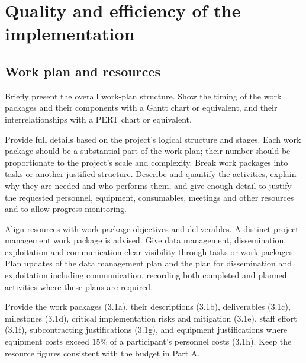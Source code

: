 \section{Quality and efficiency of the implementation}
\label{sec:implementation}


\subsection{Work plan and resources}
\label{sec:work-plan}
\begin{heguidance}
Briefly present the overall work-plan structure. Show the timing of the work
packages and their components with a Gantt chart or equivalent, and their
interrelationships with a PERT chart or equivalent.

Provide full details based on the project's logical structure and stages.
Each work package should be a substantial part of the work plan; their number
should be proportionate to the project's scale and complexity. Break work
packages into tasks or another justified structure. Describe and quantify the
activities, explain why they are needed and who performs them, and give enough
detail to justify the requested personnel, equipment, consumables, meetings and
other resources and to allow progress monitoring.

Align resources with work-package objectives and deliverables. A distinct
project-management work package is advised. Give data management,
dissemination, exploitation and communication clear visibility through tasks
or work packages. Plan updates of the data management plan and the plan for
dissemination and exploitation including communication, recording both
completed and planned activities where these plans are required.

Provide the work packages (3.1a), their descriptions (3.1b), deliverables
(3.1c), milestones (3.1d), critical implementation risks and mitigation (3.1e),
staff effort (3.1f), subcontracting justifications (3.1g), and equipment
justifications where equipment costs exceed 15\% of a participant's personnel
costs (3.1h). Keep the resource figures consistent with the budget in Part A.
\end{heguidance}

